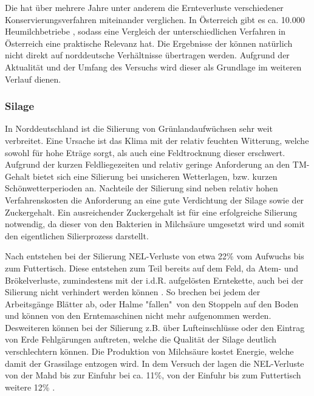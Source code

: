 Die \HBLFA hat über mehrere Jahre unter anderem die Ernteverluste verschiedener Konservierungsverfahren miteinander verglichen.
In Österreich gibt es ca. 10.000 Heumilchbetriebe \parencite[75]{fritz2018ansatz}, sodass eine Vergleich der unterschiedlichen Verfahren in Österreich eine praktische Relevanz hat.
Die Ergebnisse der \HBLFA können natürlich nicht direkt auf norddeutsche Verhältnisse übertragen werden.
Aufgrund der Aktualität und der Umfang des Versuchs wird dieser als Grundlage im weiteren Verlauf dienen.


\subsubsection{Silage}
\label{subsub:Silage}
In Norddeutschland ist die Silierung von Grünlandaufwüchsen sehr weit verbreitet.
Eine Ursache ist das Klima mit der relativ feuchten Witterung, welche sowohl für hohe Eträge sorgt, als auch eine Feldtrocknung dieser erschwert.
Aufgrund der kurzen Feldliegezeiten und relativ geringe Anforderung an den \ac{TM}-Gehalt bietet sich eine Silierung bei unsicheren Wetterlagen, bzw. kurzen Schönwetterperioden an. 
Nachteile der Silierung sind neben relativ hohen Verfahrenskosten die Anforderung an eine gute Verdichtung der Silage sowie der Zuckergehalt.
Ein ausreichender Zuckergehalt ist für eine erfolgreiche Silierung notwendig, da dieser von den Bakterien in Milchsäure umgesetzt wird und somit den eigentlichen Silierprozess darstellt. 

Nach \textcite[30]{fritz2018wirtschaftliche} entstehen bei der Silierung \ac{NEL}-Verluste von etwa 22\% vom Aufwuchs bis zum Futtertisch.
Diese entstehen zum Teil bereits auf dem Feld, da Atem- und Brökelverluste, zumindestens mit der i.d.R. aufgelösten Erntekette, auch bei der Silierung nicht verhindert werden können \parencite[58f]{gruber2015einfluss}.
So brechen bei jedem der Arbeitsgänge Blätter ab, oder Halme "fallen"\ von den Stoppeln auf den Boden und können von den Erntemaschinen nicht mehr aufgenommen werden.
Desweiteren können bei der Silierung z.B. über Lufteinschlüsse oder den Eintrag von Erde Fehlgärungen auftreten, welche die Qualität der Silage deutlich verschlechtern können.
Die Produktion von Milchsäure kostet Energie, welche damit der Grassilage entzogen wird\parencite[61]{gruber2015einfluss}.
In dem Versuch der \HBLFA lagen die \ac{NEL}-Verluste von der Mahd bis zur Einfuhr bei ca. 11\%, von der Einfuhr bis zum Futtertisch weitere 12\% \parencite[30]{fritz2018wirtschaftliche}.

